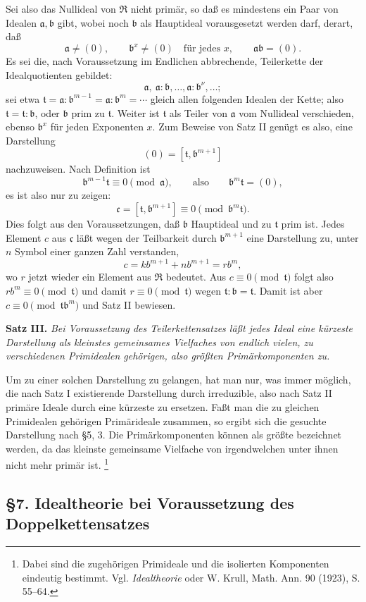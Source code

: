 \documentclass[11pt]{article}
\providecommand{\mR}{\mathfrak{R}}
\providecommand{\ma}{\mathfrak{a}}
\providecommand{\mb}{\mathfrak{b}}
\providecommand{\mc}{\mathfrak{c}}
\providecommand{\mt}{\mathfrak{t}}
\begin{document}
Sei also das Nullideal von $\mR$ nicht primär, so daß es mindestens ein Paar von Idealen $\ma,\mb$ gibt, wobei noch $\mb$ als Hauptideal vorausgesetzt werden darf, derart, daß
\[
\ma\ne(0),\qquad \mb^x\ne(0)\quad\text{für jedes }x,
\qquad \ma\mb=(0).
\]
Es sei die, nach Voraussetzung im Endlichen abbrechende, Teilerkette der Idealquotienten gebildet:
\[
\ma,\ \ma:\mb,\ldots,\ma:\mb^\nu,\ldots;
\]
sei etwa $\mt=\ma:\mb^{m-1}=\ma:\mb^m=\cdots$ gleich allen folgenden Idealen der Kette; also $\mt=\mt:\mb$, oder $\mb$ prim zu $\mt$. Weiter ist $\mt$ als Teiler von $\ma$ vom Nullideal verschieden, ebenso $\mb^x$ für jeden Exponenten $x$. Zum Beweise von Satz II genügt es also, eine Darstellung
\[
(0)=[\mt,\mb^{m+1}]
\]
nachzuweisen. Nach Definition ist
\[
\mb^{m-1}\mt\equiv0\pmod{\ma},\qquad\text{also}\qquad \mb^m\mt=(0),
\]
es ist also nur zu zeigen:
\[
\mc=[\mt,\mb^{m+1}]\equiv0\pmod{\mb^m\mt}.
\]
Dies folgt aus den Voraussetzungen, daß $\mb$ Hauptideal und zu $\mt$ prim ist. Jedes Element $c$ aus $\mc$ läßt wegen der Teilbarkeit durch $\mb^{m+1}$ eine Darstellung zu, unter $n$ Symbol einer ganzen Zahl verstanden,
\[
 c=k b^{m+1}+n b^{m+1}=r b^m,
\]
wo $r$ jetzt wieder ein Element aus $\mR$ bedeutet. Aus $c\equiv0\pmod{\mt}$ folgt also $r b^m\equiv0\pmod{\mt}$ und damit $r\equiv0\pmod{\mt}$ wegen $\mt:\mb=\mt$. Damit ist aber $c\equiv0\pmod{\mt\mb^m}$ und Satz II bewiesen.

\textbf{Satz III.} \emph{Bei Voraussetzung des Teilerkettensatzes läßt jedes Ideal eine kürzeste Darstellung als kleinstes gemeinsames Vielfaches von endlich vielen, zu verschiedenen Primidealen gehörigen, also größten Primärkomponenten zu.}

Um zu einer solchen Darstellung zu gelangen, hat man nur, was immer möglich, die nach Satz I existierende Darstellung durch irreduzible, also nach Satz II primäre Ideale durch eine kürzeste zu ersetzen. Faßt man die zu gleichen Primidealen gehörigen Primärideale zusammen, so ergibt sich die gesuchte Darstellung nach §5, 3. Die Primärkomponenten können als größte bezeichnet werden, da das kleinste gemeinsame Vielfache von irgendwelchen unter ihnen nicht mehr primär ist.
\footnote{Dabei sind die zugehörigen Primideale und die isolierten Komponenten eindeutig bestimmt. Vgl. \emph{Idealtheorie} oder W. Krull, Math. Ann. 90 (1923), S. 55--64.}

\subsection*{§7. Idealtheorie bei Voraussetzung des Doppelkettensatzes}
\end{document}
